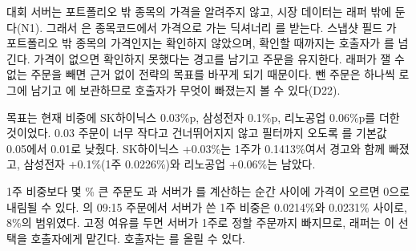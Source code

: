  대회 서버는 포트폴리오 밖 종목의 가격을 알려주지 않고, 시장 데이터는 래퍼 밖에 둔다(N1). 그래서 은 종목코드에서 가격으로 가는 딕셔너리 를 받는다. 스냅샷 필드 가 포트폴리오 밖 종목의 가격인지는 확인하지 않았으며, 확인할 때까지는 호출자가 를 넘긴다. 가격이 없으면 확인하지 못했다는 경고를 남기고 주문을 유지한다. 래퍼가 잴 수 없는 주문을 빼면 근거 없이 전략의 목표를 바꾸게 되기 때문이다. 뺀 주문은 하나씩 로그에 남기고 에 보관하므로 호출자가 무엇이 빠졌는지 볼 수 있다(D22).

 목표는 현재 비중에 SK하이닉스 0.03\%p, 삼성전자 0.1\%p, 리노공업 0.06\%p를 더한 것이었다. 0.03 주문이 너무 작다고 건너뛰어지지 않고 필터까지 오도록 를 기본값 0.05에서 0.01로 낮췄다. SK하이닉스 +0.03\%는 1주가 0.1413\%여서 경고와 함께 빠졌고, 삼성전자 +0.1\%(1주 0.0226\%)와 리노공업 +0.06\%는 남았다.

 1주 비중보다 몇 \% 큰 주문도 과 서버가 를 계산하는 순간 사이에 가격이 오르면 0으로 내림될 수 있다. 의 09:15 주문에서 서버가 쓴 1주 비중은 0.0214\%와 0.0231\% 사이로, 8\%의 범위였다. 고정 여유를 두면 서버가 1주로 정할 주문까지 빠지므로, 래퍼는 이 선택을 호출자에게 맡긴다. 호출자는 를 올릴 수 있다.

